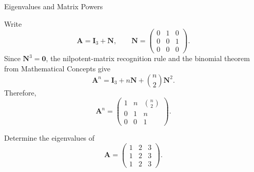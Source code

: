 \begin{expectedproblemgroup}{Eigenvalues and Matrix Powers}
        \begin{expectedsubsolution}
            Write
            \[
                \mathbf{A}=\mathbf{I}_3+\mathbf{N},
                \qquad
                \mathbf{N}
                =
                \begin{pmatrix}
                    0 & 1 & 0\\
                    0 & 0 & 1\\
                    0 & 0 & 0
                \end{pmatrix}.
            \]
            Since $\mathbf{N}^3=\mathbf{0}$, the nilpotent-matrix recognition rule
            and the binomial theorem from Mathematical Concepts give
            \[
                \mathbf{A}^n
                =
                \mathbf{I}_3+n\mathbf{N}+\binom{n}{2}\mathbf{N}^2.
            \]
            Therefore,
            \[
                \boxed{
                    \mathbf{A}^n
                    =
                    \begin{pmatrix}
                        1 & n & \binom{n}{2}\\
                        0 & 1 & n\\
                        0 & 0 & 1
                    \end{pmatrix}
                }.
            \]
        \end{expectedsubsolution}

        \begin{expectedsubproblem}
            Determine the eigenvalues of
            \[
                \mathbf{A}
                =
                \begin{pmatrix}
                    1 & 2 & 3\\
                    1 & 2 & 3\\
                    1 & 2 & 3
                \end{pmatrix}.
            \]
        \end{expectedsubproblem}


\end{expectedproblemgroup}
